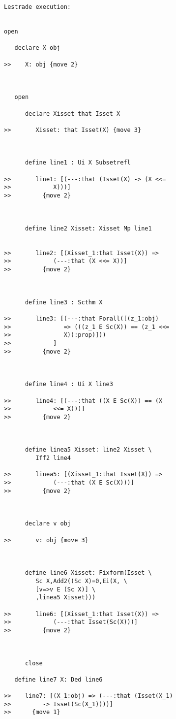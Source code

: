 \documentclass[12pt]{article}
\begin{document}
\begin{verbatim}Lestrade execution:


open

   declare X obj

>>    X: obj {move 2}



   open

      declare Xisset that Isset X

>>       Xisset: that Isset(X) {move 3}



      define line1 : Ui X Subsetrefl

>>       line1: [(---:that (Isset(X) -> (X <<=
>>            X)))]
>>         {move 2}



      define line2 Xisset: Xisset Mp line1


>>       line2: [(Xisset_1:that Isset(X)) =>
>>            (---:that (X <<= X))]
>>         {move 2}



      define line3 : Scthm X

>>       line3: [(---:that Forall([(z_1:obj)
>>               => (((z_1 E Sc(X)) == (z_1 <<=
>>               X)):prop)]))
>>            ]
>>         {move 2}



      define line4 : Ui X line3

>>       line4: [(---:that ((X E Sc(X)) == (X
>>            <<= X)))]
>>         {move 2}



      define linea5 Xisset: line2 Xisset \
         Iff2 line4

>>       linea5: [(Xisset_1:that Isset(X)) =>
>>            (---:that (X E Sc(X)))]
>>         {move 2}



      declare v obj

>>       v: obj {move 3}



      define line6 Xisset: Fixform(Isset \
         Sc X,Add2((Sc X)=0,Ei(X, \
         [v=>v E (Sc X)] \
         ,linea5 Xisset)))

>>       line6: [(Xisset_1:that Isset(X)) =>
>>            (---:that Isset(Sc(X)))]
>>         {move 2}



      close

   define line7 X: Ded line6

>>    line7: [(X_1:obj) => (---:that (Isset(X_1)
>>         -> Isset(Sc(X_1))))]
>>      {move 1}




\end{verbatim}
\end{document}

